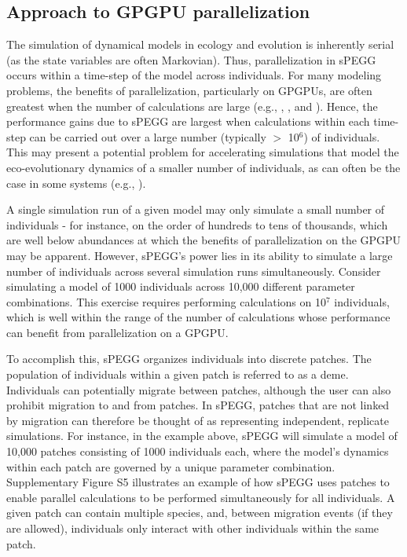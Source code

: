 \documentclass[1p,numbered]{article}
\begin{document}
\begin{linenumbers}
\subsection*{Approach to GPGPU parallelization}
The simulation of dynamical models in ecology and evolution is inherently serial (as the state variables are often Markovian). Thus, parallelization in sPEGG occurs within a time-step of the model across individuals. For many modeling problems, the benefits of parallelization, particularly on GPGPUs, are often greatest when the number of calculations are large (e.g., \citealt{harish07}, \citealt{nyland07}, and \citealt{owens08}). Hence, the performance gains due to sPEGG are largest when calculations within each time-step can be carried out over a large number (typically $>$ 10$^6$) of individuals. This may present a potential problem for accelerating simulations that model the eco-evolutionary dynamics of a smaller number of individuals, as can often be the case in some systems (e.g., \citealt{pelletier09}). 

A single simulation run of a given model may only simulate a small number of individuals - for instance, on the order of hundreds to tens of thousands, which are well below abundances at which the benefits of parallelization on the GPGPU may be apparent. However, sPEGG's power lies in its ability to simulate a large number of individuals across several simulation runs simultaneously. Consider simulating a model of 1000 individuals across 10,000 different parameter combinations. This exercise requires performing calculations on 10$^7$ individuals, which is well within the range of the number of calculations whose performance can benefit from parallelization on a GPGPU. 

To accomplish this, sPEGG organizes individuals into discrete patches. The population of individuals within a given patch is referred to as a deme. Individuals can potentially migrate between patches, although the user can also prohibit migration to and from patches. In sPEGG, patches that are not linked by migration can therefore be thought of as representing independent, replicate simulations. For instance, in the example above, sPEGG will simulate a model of 10,000 patches consisting of 1000 individuals each, where the model's dynamics within each patch are governed by a unique parameter combination. Supplementary Figure S5 illustrates an example of how sPEGG uses patches to enable parallel calculations to be performed simultaneously for all individuals. A given patch can contain multiple species, and, between migration events (if they are allowed), individuals only interact with other individuals within the same patch. 


\end{linenumbers}
\end{document}
